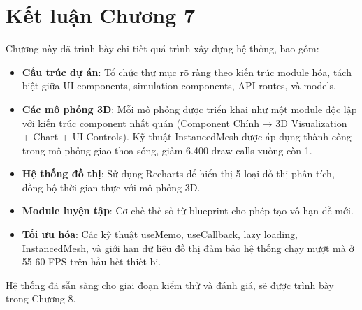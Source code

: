 \section{Kết luận Chương 7}

Chương này đã trình bày chi tiết quá trình xây dựng hệ thống, bao gồm:

\begin{itemize}
    \item \textbf{Cấu trúc dự án}: Tổ chức thư mục rõ ràng theo kiến trúc module hóa, tách biệt giữa UI components, simulation components, API routes, và models.
    
    \item \textbf{Các mô phỏng 3D}: Mỗi mô phỏng được triển khai như một module độc lập với kiến trúc component nhất quán (Component Chính → 3D Visualization + Chart + UI Controls). Kỹ thuật InstancedMesh được áp dụng thành công trong mô phỏng giao thoa sóng, giảm 6.400 draw calls xuống còn 1.
    
    \item \textbf{Hệ thống đồ thị}: Sử dụng Recharts để hiển thị 5 loại đồ thị phân tích, đồng bộ thời gian thực với mô phỏng 3D.
    
    \item \textbf{Module luyện tập}: Cơ chế thế số từ blueprint cho phép tạo vô hạn đề mới.
    
    \item \textbf{Tối ưu hóa}: Các kỹ thuật useMemo, useCallback, lazy loading, InstancedMesh, và giới hạn dữ liệu đồ thị đảm bảo hệ thống chạy mượt mà ở 55-60 FPS trên hầu hết thiết bị.
\end{itemize}

Hệ thống đã sẵn sàng cho giai đoạn kiểm thử và đánh giá, sẽ được trình bày trong Chương 8.